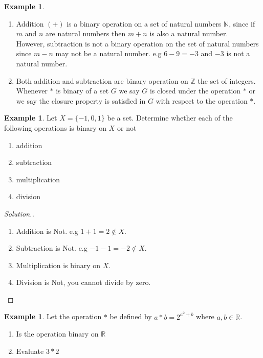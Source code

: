 \documentclass[11pt,a4paper]{article}
\theoremstyle{definition}
\newtheorem{example}[thm]{Example}
\newenvironment{solution}
  {\renewcommand{\qedsymbol}{}\begin{proof}[\textit{Solution}.]}
  {\end{proof}}
\begin{document}
\begin{example}

\begin{enumerate}
\item Addition $(+)$ is a binary operation on a set of natural numbers $\mathbb{N}$, since if $m$ and $n$  are natural numbers then $m+n$ is also a natural number.\\
However, subtraction is not a binary operation on the set of natural numbers since $m-n$ may not be a natural number. e.g $6-9=-3$ and $-3$ is not a natural number.
\item Both addition and subtraction are binary operation on $\mathbb{Z}$ the  set of integers.\\ Whenever $*$ is binary of a set $G$ we say $G$ is closed under the operation $*$ or we say the closure property is satisfied in $G$ with respect to the operation $*$.\\
\end{enumerate}
\end{example}
\begin{example}

Let $X=\{-1,0,1\}$ be a set. Determine whether each of the following operations is binary on $X$ or not
\begin{enumerate}
\item[(a).] addition
\item[(b).] subtraction
\item[(c).] multiplication
\item[(d).] division\\
\end{enumerate}
\end{example}
\begin{solution}

\begin{enumerate}
\item[(a).] Addition is Not. e.g $1+1=2\not\in X.$
\item[(b).] Subtraction is Not. e.g $-1-1=-2\not \in X$.
\item[(c).] Multiplication is binary on $X$.
\item[(d).] Division is Not, you cannot divide by zero.\\
\end{enumerate}
\end{solution}
\pagebreak
\begin{example}

Let the operation $*$ be defined by $a*b=2^{a^2+b}$ where $a,b \in \mathbb{R}$.
\begin{enumerate}
\item[(i).] Is the operation binary on $\mathbb{R}$
\item[(ii).] Evaluate $3*2$\\
\end{enumerate}
\end{example}
\end{document}
